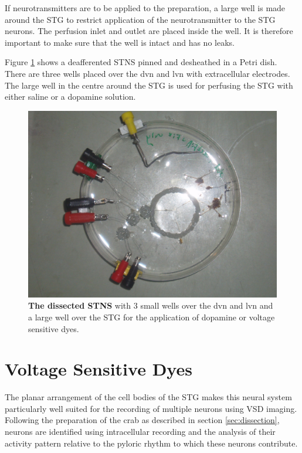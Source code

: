 If neurotransmitters are to be applied to the preparation, a large well is made around the \ac{STG} to restrict application of the neurotransmitter to the \ac{STG} neurons. The perfusion inlet and outlet are placed inside the well. It is therefore important to make sure that the well is intact and has no leaks.

Figure \ref{fig:prep} shows a deafferented \ac{STNS} pinned and desheathed in a Petri dish. There are three wells placed over the \ac{dvn} and \ac{lvn} with extracellular electrodes. The large well in the centre around the \ac{STG} is used for perfusing the \ac{STG} with either saline or a dopamine solution.


\begin{figure}[H]
	\centering
		\includegraphics[width=\columnwidth]{graphics/dissection.jpg}
		\caption[The dissected \ac{STNS}]{\textbf{The dissected \ac{STNS}} with 3 small wells over the \ac{dvn} and \ac{lvn} and a large well over the \ac{STG} for the application of dopamine or voltage sensitive dyes.}
		\label{fig:prep}
\end{figure}

\section{Voltage Sensitive Dyes}
\label{sec:vsd}
The planar arrangement of the cell bodies of the \ac{STG} makes this neural system particularly well suited for the recording of multiple neurons using \ac{VSD} imaging. Following the preparation of the crab as described in section \ref{sec:dissection}, neurons are identified using intracellular recording and the analysis of their activity pattern relative to the pyloric rhythm to which these neurons contribute.

